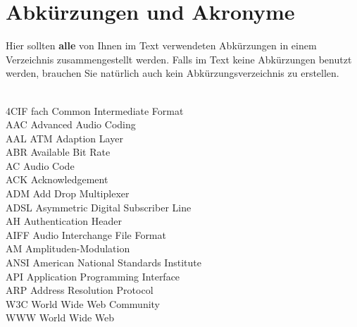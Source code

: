 \newpage

\section{Abkürzungen und Akronyme}
Hier sollten {\bf alle} von Ihnen im Text verwendeten Abkürzungen in einem Verzeichnis zusammengestellt werden. 
Falls im Text keine Abkürzungen benutzt werden, brauchen Sie natürlich auch kein Abkürzungsverzeichnis zu erstellen.
\begin{tabbing}
\hspace*{3cm}\=  \\ \kill
4CIF  fach Common Intermediate Format\\
AAC \> Advanced Audio Coding\\
AAL \> ATM Adaption Layer\\
ABR \> Available Bit Rate\\
AC \> Audio Code\\
ACK \> Acknowledgement \\
ADM \> Add Drop Multiplexer\\
ADSL \> Asymmetric Digital Subscriber Line\\
AH \> Authentication Header\\
AIFF \> Audio Interchange File Format\\
AM \> Amplituden-Modulation\\
ANSI\> American National Standards Institute\\
API \> Application Programming Interface\\
ARP \> Address Resolution Protocol \\
W3C \> World Wide Web Community\\
WWW \> World Wide Web\\
\end{tabbing}
